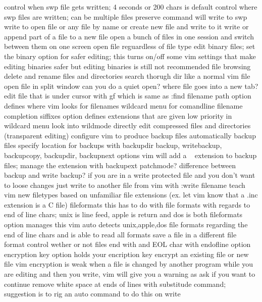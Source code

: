 \documentclass[12pt]{book}
\begin{document}
{{      control when swp file gets written; 4 seconds or 200 chars is default
      control where swp files are written; can be multiple files
      preserve command will write to swp
    write to open file or any file by name or create new file and write to it
    write or append part of a file to a new file
    open a bunch of files in one session and switch between them on one screen
    open file reguardless of file type
      edit binary files; set the binary option for safer editing; this turns on/off some vim settings that make editing binaries safer but editing binaries is still not recommended
    file browsing
      delete and rename files and directories
      search thorugh dir like a normal vim file
      open file in split window
      can you do a quiet open? where file goes into a new tab?
      edit file that is under cursor with gf which is same as :find filename
        path option defines where vim looks for filenames
      wildcard menu for comandline filename completion
        siffixes option defines extensions that are given low priority in wildcard menu
        look into wildmode
    directly edit compressed files and directories (transparent editing)
    configure vim to produce backup files
      automatically backup files
      specify location for backups with backupdir
      backup, writebackup, backupcopy, backupdir, backupnext options
      vim will add a ~ extension to backup files; manage the extension with backupext
      patchmode?
      difference between backup and write backup?
      if you are in a write protected file and you don't want to loose changes just write to another file from vim with :write filename
    teach vim new filetypes based on unfamiliar file extensions (ex. let vim know that a .inc extension is a C file)
    fileformats
      this has to do with file formats with regards to end of line chars; unix is line feed, apple is return and dos is both
      fileformats option manages this
      vim auto detects unix,apple,dos file formats regarding the end of line chars and is able to read all formats
      save a file in a different file format
    control wether or not files end with and EOL char with endofline option
    encryption
      key option holds your encription key
      encrypt an existing file or new file
      vim encryption is weak
    when a file is changed by another program while you are editing and then you write, vim will give you a warning as ask if you want to continue
    remove white space at ends of lines with substitude command; suggestion is to rig an auto command to do this on write
}}
\end{document}
